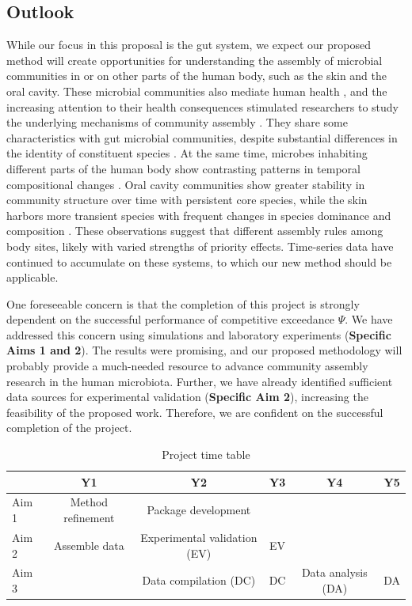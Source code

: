 \documentclass[12pt, class=article, crop=false]{standalone}
\begin{document}
\subsection*{Outlook}
While our focus in this proposal is the gut system, we expect our proposed method will create opportunities for understanding the assembly of microbial communities in or on other parts of the human body, such as the skin and the oral cavity.
These microbial communities also mediate human health \citep{fierer_animalcules_2012}, and the increasing attention to their health consequences stimulated researchers to study the underlying mechanisms of community assembly \citep{grice_topographical_2009, jakobsson_short-term_2010, costello_bacterial_2009, caporaso_moving_2011}.
They share some characteristics with gut microbial communities, despite substantial differences in the identity of constituent species \citep{costello_bacterial_2009}.
At the same time, microbes inhabiting different parts of the human body show contrasting patterns in temporal compositional changes \citep{costello_bacterial_2009, caporaso_moving_2011, fierer_animalcules_2012, jakobsson_short-term_2010}.
Oral cavity communities show greater stability in community structure over time with persistent core species, while the skin harbors more transient species with frequent changes in species dominance and composition \citep{costello_bacterial_2009}.
These observations suggest that different assembly rules among body sites, likely with varied strengths of priority effects.
Time-series data have continued to accumulate on these systems, to which our new method should be applicable.

One foreseeable concern is that the completion of this project is strongly dependent on the successful performance of competitive exceedance $\Psi$.
We have addressed this concern using simulations and laboratory experiments  (\textbf{Specific Aims 1 and 2}).
The results were promising, and our proposed methodology will probably provide a much-needed resource to advance community assembly research in the human microbiota.
Further, we have already identified sufficient data sources for experimental validation (\textbf{Specific Aim 2}), increasing the feasibility of the proposed work.
Therefore, we are confident on the successful completion of the project.

\begin{table}
    \centering
    \caption{Project time table}
    \begin{tabular}{lccccc}
         & Y1 &  Y2 & Y3 & Y4 & Y5\\
         \hline
         Aim 1 & Method refinement & Package development & & & \\
         Aim 2 & Assemble data & Experimental validation (EV) & EV &  & \\
         Aim 3 & & Data compilation (DC) & DC & Data analysis (DA) & DA \\
    \end{tabular}
    \label{tab:tt}
\end{table}

\newpage


\end{document}

